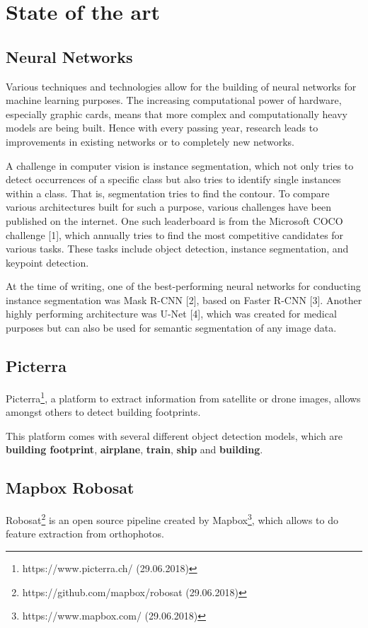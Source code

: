
\chapter{State of the art}\label{chp:state_of_the_art}

\section{Neural Networks}
Various techniques and technologies allow for the building of neural networks for machine learning purposes. The increasing computational power of hardware, especially graphic cards, means that more complex and computationally heavy models are being built. Hence with every passing year, research leads to improvements in existing networks or to completely new networks.

A challenge in computer vision is instance segmentation, which not only tries to detect occurrences of a specific class but also tries to identify single instances within a class. That is, segmentation tries to find the contour. To compare various architectures built for such a purpose, various challenges have been published on the internet. One such leaderboard is from the Microsoft COCO challenge [1], which annually tries to find the most competitive candidates for various tasks. These tasks include object detection, instance segmentation, and keypoint detection.

At the time of writing, one of the best-performing neural networks for conducting instance segmentation was Mask R-CNN [2], based on Faster R-CNN [3]. Another highly performing architecture was U-Net [4], which was created for medical purposes but can also be used for semantic segmentation of any image data.

\section{Picterra}
Picterra\footnote{https://www.picterra.ch/ (29.06.2018)}, a platform to extract information from satellite or drone images, allows amongst others to detect building footprints.

This platform comes with several different object detection models, which are \textbf{building footprint}, \textbf{airplane}, \textbf{train}, \textbf{ship} and \textbf{building}.

\section{Mapbox Robosat}
Robosat\footnote{https://github.com/mapbox/robosat (29.06.2018)} is an open source pipeline created by Mapbox\footnote{https://www.mapbox.com/ (29.06.2018)}, which allows to do feature extraction from orthophotos.